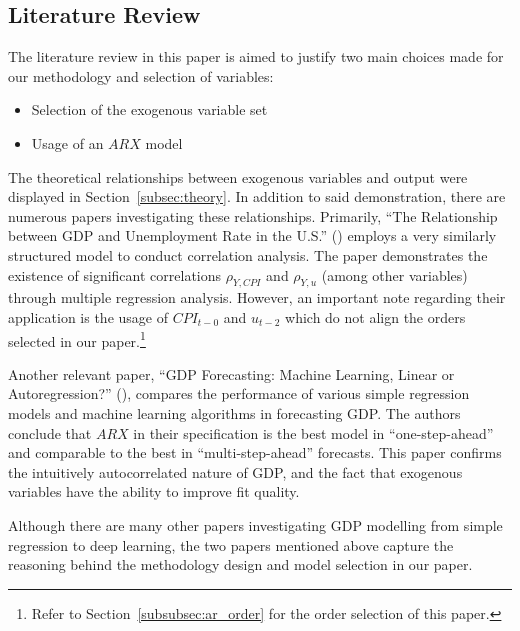\subsection{Literature Review}\label{subsec:litreview}
The literature review in this paper is aimed to justify two main choices made for our methodology and selection of variables:
\begin{itemize}
    \item Selection of the exogenous variable set
    \item Usage of an $ARX$ model
\end{itemize}

The theoretical relationships between exogenous variables and output were displayed in Section~\ref{subsec:theory}. 
In addition to said demonstration, there are numerous papers investigating these relationships.
Primarily, \enquote{The Relationship between GDP and Unemployment Rate in the U.S.} (\cite{mandel_relationship_2019}) employs a very similarly structured model to conduct correlation analysis.
The paper demonstrates the existence of significant correlations $\rho_{Y, CPI}$ and $\rho_{Y, u}$ (among other variables) through multiple regression analysis.
However, an important note regarding their application is the usage of $CPI_{t-0}$ and $u_{t-2}$ which do not align the orders selected in our paper.\footnote{Refer to Section~\ref{subsubsec:ar_order} for the order selection of this paper.}

\vspace{\baselineskip}

Another relevant paper, \enquote{GDP Forecasting: Machine Learning, Linear or Autoregression?} (\cite{maccarrone_gdp_2021}), compares the performance of various simple regression models and machine learning algorithms in forecasting GDP.
The authors conclude that $ARX$ in their specification is the best model in \enquote{one-step-ahead} and comparable to the best in \enquote{multi-step-ahead} forecasts.
This paper confirms the intuitively autocorrelated nature of GDP, and the fact that exogenous variables have the ability to improve fit quality.

\vspace{\baselineskip}

Although there are many other papers investigating GDP modelling from simple regression to deep learning, the two papers mentioned above capture the reasoning behind the methodology design and model selection in our paper.
